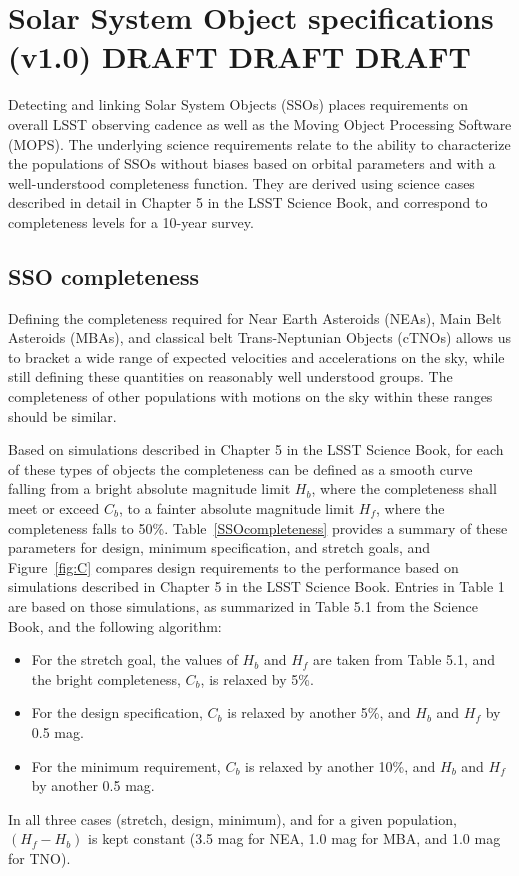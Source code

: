 \documentclass[manuscript]{aastex}
\begin{document}
\section{Solar System Object specifications (v1.0) DRAFT DRAFT DRAFT}

Detecting and linking Solar System Objects (SSOs) places requirements on overall LSST observing cadence as well 
as the Moving Object Processing Software (MOPS). The underlying science requirements relate to the ability to 
characterize the populations of  SSOs without biases based on orbital parameters and with a well-understood 
completeness function. They are derived using science cases described in detail in Chapter 5 in the LSST Science 
Book, and correspond to completeness levels for a 10-year survey. 

\subsection{SSO completeness}

Defining the completeness required for Near Earth Asteroids (NEAs), Main Belt Asteroids (MBAs), and classical belt Trans-Neptunian Objects (cTNOs) allows us to bracket a wide range of expected velocities and accelerations on the sky, while still defining these quantities on reasonably well understood groups. The completeness of other populations with motions on the sky within these ranges should be similar. 

Based on simulations described in Chapter 5 in the LSST Science Book, for each of these types of objects the completeness can be defined as a smooth curve falling from a bright absolute magnitude limit $H_b$, where the completeness shall meet or exceed $C_b$, to a fainter absolute magnitude limit $H_f$,  where the completeness falls to 50\%. Table~\ref{SSOcompleteness} provides a summary of these parameters for design, minimum specification, and stretch goals, and Figure~\ref{fig:C} compares design requirements
to the performance based on simulations described in Chapter 5 in the LSST Science Book. 
Entries in Table 1 are based on those simulations, as summarized in Table 5.1 from the Science Book, 
and the following algorithm:
\begin{itemize}
\item For the stretch goal, the values of $H_b$ and $H_f$ are taken from Table 5.1, and the bright completeness, 
$C_b$, is relaxed by 5\%.
\item For the design specification, $C_b$ is relaxed by another 5\%, and $H_b$ and $H_f$ by 0.5 mag. 
\item For the minimum requirement, $C_b$ is relaxed by another 10\%, and $H_b$ and $H_f$ by another 0.5 mag. 
\end{itemize}
In all three cases (stretch, design, minimum), and for a given population, $(H_f-H_b)$ is kept constant 
(3.5 mag for NEA, 1.0 mag for MBA, and 1.0 mag for TNO). 
\end{document}
